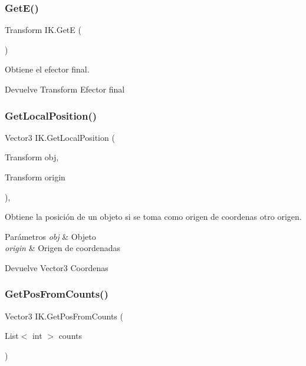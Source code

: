 \subsubsection{\texorpdfstring{GetE()}{GetE()}}
{\footnotesize\ttfamily Transform I\+K.\+GetE (\begin{DoxyParamCaption}{ }\end{DoxyParamCaption})\hspace{0.3cm}{\ttfamily [inline]}}

Obtiene el efector final. \begin{DoxyReturn}{Devuelve}
Transform Efector final 
\end{DoxyReturn}
\mbox{\label{class_i_k_a39c773afffbbc08a778a6a6ded4ebe9f}} 
\subsubsection{\texorpdfstring{GetLocalPosition()}{GetLocalPosition()}}
{\footnotesize\ttfamily Vector3 I\+K.\+Get\+Local\+Position (\begin{DoxyParamCaption}\item[{Transform}]{obj,  }\item[{Transform}]{origin }\end{DoxyParamCaption})\hspace{0.3cm}{\ttfamily [inline]}, {\ttfamily [private]}}

Obtiene la posición de un objeto si se toma como origen de coordenas otro origen. 
\begin{DoxyParams}{Parámetros}
{\em obj} & Objeto \\
\hline
{\em origin} & Origen de coordenadas \\
\hline
\end{DoxyParams}
\begin{DoxyReturn}{Devuelve}
Vector3 Coordenas 
\end{DoxyReturn}
\mbox{\label{class_i_k_a265ad7e93d155fb6183a60baa8d97b4d}} 
\subsubsection{\texorpdfstring{GetPosFromCounts()}{GetPosFromCounts()}}
{\footnotesize\ttfamily Vector3 I\+K.\+Get\+Pos\+From\+Counts (\begin{DoxyParamCaption}\item[{List$<$ int $>$}]{counts }\end{DoxyParamCaption})\hspace{0.3cm}{\ttfamily [inline]}}

